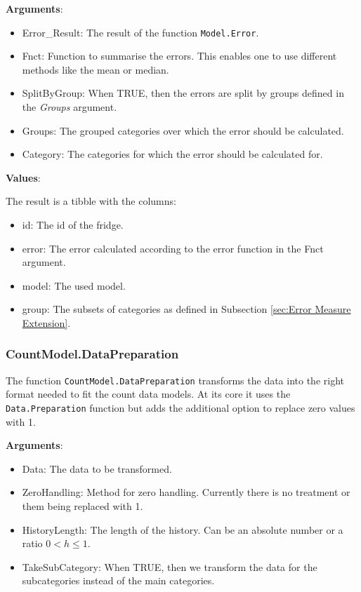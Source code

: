 \textbf{Arguments}:

\begin{itemize}
	\item Error\_Result: The result of the function \texttt{Model.Error}.
	\item Fnct: Function to summarise the errors. This enables one to use different methods like the mean or median. 
	\item SplitByGroup: When TRUE, then the errors are split by groups defined in the \textit{Groups} argument. 
	\item Groups: The grouped categories over which the error should be calculated. 
	\item Category: The categories for which the error should be calculated for.
\end{itemize}

\textbf{Values}:

The result is a tibble with the columns:
\begin{itemize}
	\item id: The id of the fridge. 
	\item error: The error calculated according to the error function in the Fnct argument. 
	\item model: The used model. 
	\item group: The subsets of categories as defined in Subsection \ref{sec:Error Measure Extension}.
\end{itemize}


\subsubsection{CountModel.DataPreparation}
\label{sec:CountModel.DataPreparation}

The function \texttt{CountModel.DataPreparation} transforms the data into the right format needed to fit the count data models. At its core it uses the \texttt{Data.Preparation} function but adds the additional option to replace zero values with 1. 

\textbf{Arguments}:

\begin{itemize}
	\item Data: The data to be transformed.
	\item ZeroHandling: Method for zero handling. Currently there is no treatment or them being replaced with 1. 
	\item HistoryLength: The length of the history. Can be an absolute number or a ratio $0<h\leq 1$. 
	\item TakeSubCategory: When TRUE, then we transform the data for the subcategories instead of the main categories. 
\end{itemize}

